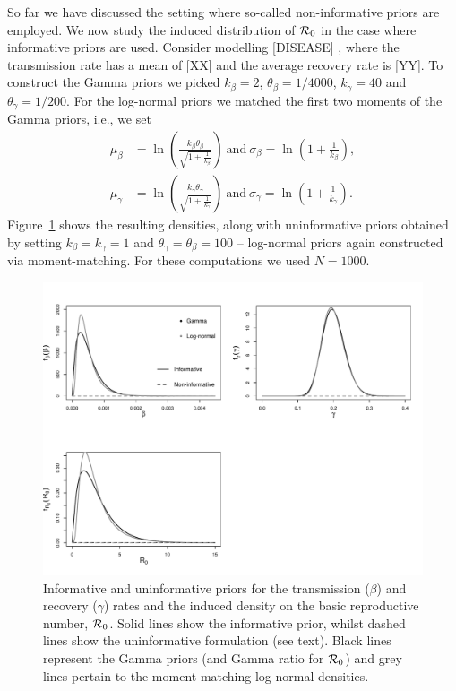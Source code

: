 \documentclass[alpha-refs]{wiley-article}
\newcommand{\rr}{ {\cal R}_0 }						%
\begin{document}
So far we have discussed the setting where so-called non-informative priors are employed.
We now study the induced distribution of $\rr$ in the case where informative priors are used. 
Consider modelling [DISEASE] , where the transmission rate has a mean of [XX] and the average recovery rate is [YY].
To construct the Gamma priors we picked $k_{\beta} = 2$, $\theta_{\beta} = 1/4000$, $k_{\gamma} = 40$ and $\theta_{\gamma} = 1/200$.
For the log-normal priors we matched the first two moments of the Gamma priors, i.e., we set
\begin{align*}
 \mu_{\beta} &= \ln \left( \frac{ k_{\beta} \theta_{\beta} }{\sqrt{1 + \frac{1}{k_{\beta}} }} \right) \:\text{and}\: \sigma_{\beta} = \ln \left( 1 +  \frac{ 1}{ k_{\beta}} \right), \\
 \mu_{\gamma} &= \ln \left( \frac{ k_{\gamma} \theta_{\gamma} }{\sqrt{1 + \frac{1}{k_{\gamma}} }} \right) \:\text{and}\: \sigma_{\gamma} =  \ln \left( 1 +  \frac{ 1}{ k_{\gamma}} \right).
\end{align*}
Figure~\ref{fig:informative_priors_example} shows the resulting densities, along with uninformative priors obtained by setting $k_{\beta} = k_{\gamma} =  1$ and $\theta_{\gamma} = \theta_{\beta} = 100$ -- log-normal priors again constructed via moment-matching.
For these computations we used $N = 1000$.

\begin{figure}[bt]
\centering
\includegraphics[scale=0.4]{figures/informative_example.pdf}
\caption{Informative and uninformative priors for the transmission ($\beta$) and recovery ($\gamma$) rates and the induced density on the basic reproductive number, $\rr$.
Solid lines show the informative prior, whilst dashed lines show the uninformative formulation (see text).
Black lines represent the Gamma priors (and Gamma ratio for $\rr$) and grey lines pertain to the moment-matching log-normal densities.}
\label{fig:informative_priors_example}
\end{figure}
\end{document}
